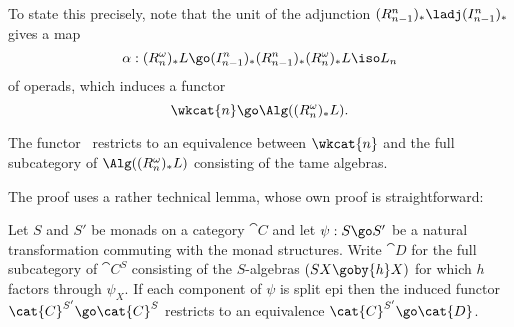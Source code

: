 To state this precisely, note that the unit of the adjunction
$(R^n_{n-1})_* \ladj (I^n_{n-1})_*$ gives a map
% 
\begin{equation}	\label{eq:tame-unit}
\alpha:
(R^\omega_n)_* L 
\go 
(I^n_{n-1})_* (R^n_{n-1})_* (R^\omega_n)_* L
\iso
L_n
\end{equation}
% 
of operads, which induces a functor
%
\begin{equation}	\label{eq:tame-eqv}
\wkcat{n} \go \Alg((R^\omega_n)_* L).
\end{equation}
%
\begin{propn}	
The functor~ restricts to an equivalence between
$\wkcat{n}$ and the full subcategory of $\Alg((R^\omega_n)_* L)$ consisting
of the tame algebras.
\end{propn}
%
The proof uses a rather technical lemma, whose own proof is
straightforward: 
%
\begin{lemma}
Let $S$ and $S'$ be monads on a category $\cat{C}$ and let $\psi: S \go
S'$ be a natural transformation commuting with the monad structures.  Write
$\cat{D}$ for the full subcategory of $\cat{C}^S$ consisting of the
$S$-algebras $(SX \goby{h} X)$ for which $h$ factors through $\psi_X$.  If
each component of $\psi$ is split epi then the induced functor
$\cat{C}^{S'} \go \cat{C}^S$ restricts to an equivalence $\cat{C}^{S'} \go
\cat{D}$.  
\done
\end{lemma}
% 

